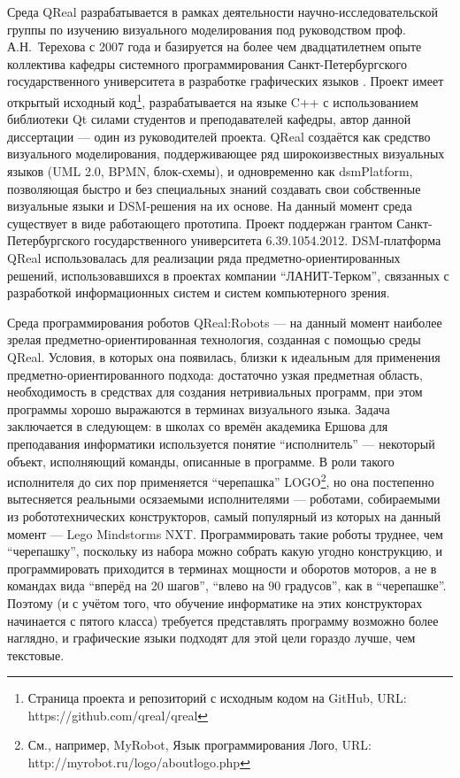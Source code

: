 Среда QReal разрабатывается в рамках деятельности научно-исследовательской 
группы по изучению визуального моделирования под руководством проф. 
А.Н.~Терехова с 2007 года и базируется на более чем двадцатилетнем опыте 
коллектива кафедры системного программирования Санкт-Петербургского 
государственного университета в разработке графических языков 
\cite{ivanov2005realit, parfenov1997rtst, terekhov1998rtst, ivanov1998object, ivanov1998behavioral}. 
Проект имеет открытый исходный 
код\footnote{Страница проекта и репозиторий с исходным кодом на GitHub, URL: https://github.com/qreal/qreal}, 
разрабатывается на языке C++ с использованием библиотеки Qt силами студентов и преподавателей кафедры, автор 
данной диссертации --- один из руководителей проекта. QReal создаётся как 
средство визуального моделирования, поддерживающее ряд широкоизвестных 
визуальных языков (\ac{UML} 2.0, \ac{BPMN}, блок-схемы), и одновременно как \ac{dsmPlatform}, 
позволяющая быстро и без специальных знаний создавать свои собственные 
визуальные языки и DSM-решения на их основе. На данный момент среда существует 
в виде работающего прототипа. Проект поддержан грантом Санкт-Петербургского 
государственного университета 6.39.1054.2012. DSM-платформа QReal использовалась
 для реализации ряда предметно-ориентированных решений, использовавшихся в 
проектах компании "`ЛАНИТ-Терком"', связанных с разработкой информационных систем 
и систем компьютерного зрения.

Среда программирования роботов QReal:Robots --- на данный момент наиболее зрелая 
предметно-ориентированная технология, созданная с помощью среды QReal. 
Условия, в которых она появилась, близки к идеальным для применения 
предметно-ориентированного подхода: достаточно узкая предметная область, 
необходимость в средствах для создания нетривиальных программ, при этом
программы хорошо выражаются в терминах визуального языка. Задача заключается в 
следующем: в школах со времён академика Ершова для преподавания информатики 
используется понятие "`исполнитель"' --- некоторый объект, исполняющий команды, 
описанные в программе. В роли такого исполнителя до сих пор применяется 
"`черепашка"' 
LOGO\footnote{См., например, MyRobot, Язык программирования Лого, URL: http://myrobot.ru/logo/aboutlogo.php}, 
но она постепенно вытесняется реальными осязаемыми исполнителями --- роботами, собираемыми из робототехнических конструкторов, 
самый популярный из которых на данный момент --- Lego Mindstorms NXT. 
Программировать такие роботы труднее, чем "`черепашку"', поскольку из набора 
можно собрать какую угодно конструкцию, и программировать приходится в терминах 
мощности и оборотов моторов, а не в командах вида "`вперёд на 20 шагов"', 
"`влево на 90 градусов"', как в "`черепашке"'. Поэтому (и с учётом того, что 
обучение информатике на этих конструкторах начинается с пятого класса) требуется 
представлять программу возможно более наглядно, и графические языки подходят 
для этой цели гораздо лучше, чем текстовые. 

